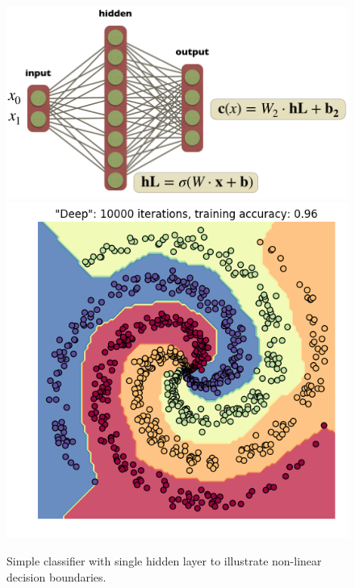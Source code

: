 \documentclass[aps,prb,floatfix,amsmath,amssymb,amsfonts,10pt,floatfix,longbibliography]{revtex4-1}
\begin{document}
\begin{enumerate}
\begin{figure}[h]
\includegraphics[width=.5\textwidth]{Figures/n2.png}
\qquad\includegraphics[width=.3\textwidth]{Figures/logistic2.png}
\caption{\label{fig:n2}
Simple classifier with single hidden layer to illustrate non-linear decision boundaries.}
\end{figure}




\end{enumerate}
\end{document}
